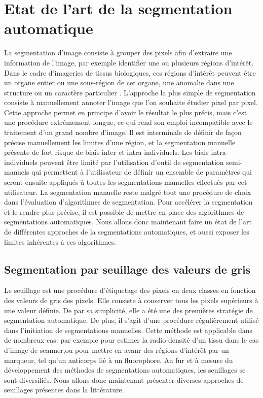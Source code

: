 \documentclass[\main/main.tex]{subfiles}
\begin{document}
            
\section{Etat de l'art de la segmentation automatique}

%
La segmentation d'image consiste à grouper des pixels afin d'extraire une information de l'image, par exemple identifier une ou plusieurs régions d'intérêt.
%
Dans le cadre d'imageries de tissus biologiques,
ces régions d'intérêt peuvent être un organe entier ou une sous\hyp{}région de cet organe\cite{early_2018,liu_2020,gupta_2018},
une anomalie dans une structure\cite{wadhwa_2019,huang_2019,ruikar_2019}
ou un caractère particulier \cite{teixid_2019,hinfray_2018} .
%
L'approche la plus simple de segmentation consiste à manuellement annoter l'image que l'on souhaite étudier pixel par pixel.
%
Cette approche permet en principe d'avoir le résultat le plus précis,
mais c'est une procédure extrêmement longue, ce qui rend son emploi incompatible avec le traitement d'un grand nombre d'image.
%
Il est interminale de définir de façon précise manuellement les limites d'une région, et la segmentation manuelle présente de fort risque de biais inter et intra\hyp{}individuels\cite{heye_2013}.
%
Les biais intra\hyp{}individuels peuvent être limité par l'utilisation d'outil de segmentation semi\hyp{}manuels\cite{berg_2019,benenson_2019} qui permettent à l'utilisateur de définir un ensemble de paramètres qui seront ensuite appliqués à toutes les segmentations manuelles effectués par cet utilisateur.
%
La segmentation manuelle reste malgré tout une procédure de choix dans l'évaluation d'algorithmes de segmentation.
%
Pour accélérer la segmentation et le rendre plus précise, il est possible de mettre en place des algorithmes de segmentations automatiques.
%
Nous allons donc maintenant faire un état de l'art de différentes approches de la segmentations automatiques, et aussi exposer les limites inhérentes à ces algorithmes.

    \subsection[Segmentations par seuillage]{Segmentation par seuillage des valeurs de gris}
    
%
Le seuillage est une procédure d'étiquetage des pixels en deux classes en fonction des valeurs de gris des pixels. Elle consiste à conserver tous les pixels supérieurs à une valeur définie. De par sa simplicité, elle a été une des premières stratégie de segmentation automatique\cite{sakai_1969,otsu_1979}.
%
De plus, il s'agit d'une procédure régulièrement utilisé dans l'initiation de segmentations manuelles.
%
Cette méthode est applicable dans de nombreux cas: par exemple pour estimer la radio\hyp{}densité d'un tissu dans le cas d'image de scanner,ou pour mettre en avanr des régions d'intérêt par un marqueur, tel qu'un anticorps lié à un fluorophore.
%
Au fur et à mesure du développement des méthodes de segmentations automatiques, les seuillages se sont diversifiés.
Nous allons donc maintenant présenter diverses approches de seuillages présentes dans la littérature.
\end{document}

